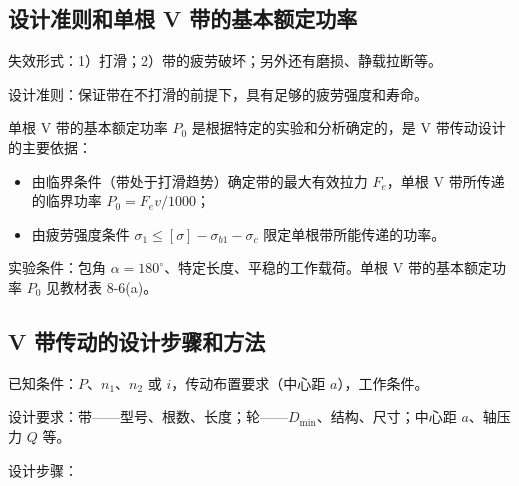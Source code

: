 \subsection{设计准则和单根 V 带的基本额定功率}
\label{sec:带传动:设计准则}

失效形式：1）打滑；2）带的疲劳破坏；另外还有磨损、静载拉断等。

设计准则：保证带在不打滑的前提下，具有足够的疲劳强度和寿命。

单根 V 带的基本额定功率 $P_0$ 是根据特定的实验和分析确定的，是 V 带传动设计的主要依据：
\begin{itemize}
	\item 由临界条件（带处于打滑趋势）确定带的最大有效拉力 $F_e$，单根 V 带所传递的临界功率 $P_0=F_e v/1000$；
	\item 由疲劳强度条件 $\sigma_1\le[\sigma]-\sigma_{b1}-\sigma_c$ 限定单根带所能传递的功率。
\end{itemize}

实验条件：包角 $\alpha=180^{\circ}$、特定长度、平稳的工作载荷。单根 V 带的基本额定功率 $P_0$ 见教材表 8-6(a)。

\subsection{V 带传动的设计步骤和方法}
\label{sec:带传动:设计步骤}

已知条件：$P$、$n_1$、$n_2$ 或 $i$，传动布置要求（中心距 $a$），工作条件。

设计要求：带——型号、根数、长度；轮——$D_{\min}$、结构、尺寸；中心距 $a$、轴压力 $Q$ 等。

设计步骤：

